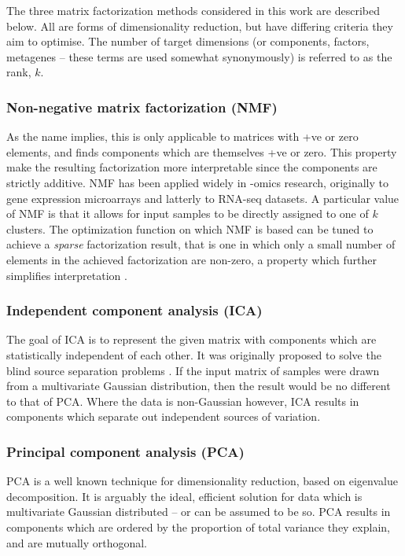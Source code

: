 \documentclass[tikz, 12pt,a4paper,oneside,fleqn]{article}
\begin{document}
The three matrix factorization methods considered in this work are described below.  All are forms of dimensionality reduction, but have differing criteria they aim to optimise.  The number of target dimensions (or components, factors, metagenes -- these terms are used somewhat synonymously) is referred to as the rank, $k$.
\subsubsection{Non-negative matrix factorization (NMF)}
\label{sec-nmf}
As the name implies, this is only applicable to matrices with +ve or zero elements, and finds components which are themselves +ve or zero.   This property make the resulting factorization more interpretable since the components are strictly additive.   
NMF has been applied widely in -omics research, originally to gene expression microarrays  and latterly to RNA-seq datasets.  
A particular value of NMF is that it allows for input samples to be directly assigned to one of $k$ clusters.   
The optimization function on which NMF is based can be tuned to achieve a \emph{sparse} factorization result, that is one in which only a small number of elements in the achieved factorization are non-zero, a property which further simplifies interpretation \cite{Brunet2004}.
%
\subsubsection{Independent component analysis (ICA)} 
The goal of ICA is to represent the given matrix with components which are statistically independent of each other.  It was originally proposed to solve the blind source separation problems \cite{Comon1994}. If the input matrix of samples were drawn from a multivariate Gaussian distribution, then the result would be no different to that of PCA.    Where the data is non-Gaussian however, ICA results in components which separate out independent sources of variation.  

\subsubsection{Principal component analysis (PCA)}
PCA is a well known technique for dimensionality reduction, based on eigenvalue decomposition.  It is arguably the ideal, efficient solution for data which is multivariate Gaussian distributed -- or can be assumed to be so.  PCA results in components which are ordered by the proportion of total variance they explain, and are mutually orthogonal.
\end{document}
